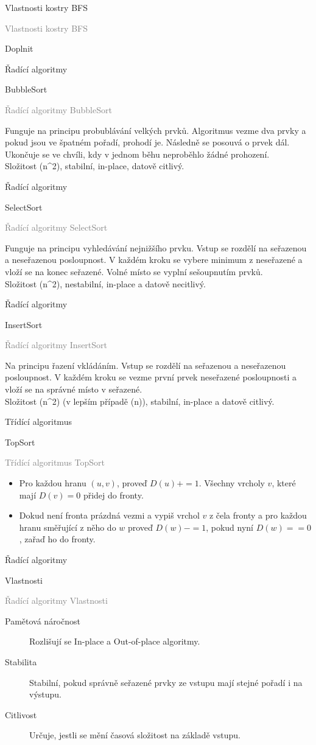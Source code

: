 \documentclass[20pt]{extarticle}
\newcommand{\card}[3][]{
	\vspace*{\fill}

	\newpage
	\topskip0pt
	\vspace*{\fill}
		\Large #2

		\vspace{1cm}
		\normalsize #1
	\vspace*{\fill}
	\newpage

	\small \textcolor{gray}{#2 #1}
	\topskip0pt
	\vspace*{\fill}

	\normalsize
	#3
	\vspace*{\fill}
}
\newcommand{\pair}[2]{\left(#1, #2\right)}
\begin{document}
\begin{center}
\card{Vlastnosti kostry BFS}{
	Doplnit
}

\card[BubbleSort]{Řadící algoritmy}{
	Funguje na principu probublávání velkých prvků. Algoritmus vezme dva prvky a pokud
	jsou ve špatném pořadí, prohodí je. Následně se posouvá o prvek dál.\\
	Ukončuje se ve chvíli, kdy v jednom běhu neproběhlo žádné prohození.\\
	Složitost \Omicron(n^2), stabilní, in-place, datově citlivý.
}

\card[SelectSort]{Řadící algoritmy}{
	Funguje na principu vyhledávání nejnižšího prvku. Vstup se rozdělí na seřazenou
	a neseřazenou posloupnost. V každém kroku se vybere minimum z neseřazené a vloží
	se na konec seřazené. Volné místo se vyplní sešoupnutím prvků.\\
	Složitost \Omicron(n^2), nestabilní, in-place a datově necitlivý.
}

\card[InsertSort]{Řadící algoritmy}{
	Na principu řazení vkládáním. Vstup se rozdělí na seřazenou a neseřazenou posloupnost.
	V každém kroku se vezme první prvek neseřazené posloupnosti a vloží se na správné
	místo v seřazené.\\
	Složitost \Omicron(n^2) (v lepším případě \Omicron(n)), stabilní, in-place a datově citlivý.
}

\card[TopSort]{Třídící algoritmus}{
	\small
	\begin{itemize}
		\item Pro každou hranu $\pair{u}{v}$, proveď $D(u)+=1$. Všechny vrcholy $v$, které mají
		$D(v)=0$ přidej do fronty.
		\item Dokud není fronta prázdná vezmi a vypiš vrchol $v$ z čela fronty a pro každou
		hranu směřující z něho do $w$ proveď $D(w)-=1$, pokud nyní $D(w)==0$, zařaď ho do fronty.
	\end{itemize}
	\normalsize
}

\card[Vlastnosti]{Řadící algoritmy}{
	\begin{description}
		\item[Pamětová náročnost] Rozlišují se In-place a Out-of-place algoritmy.
		\item[Stabilita] Stabilní, pokud správně seřazené prvky ze vstupu mají stejné pořadí i na výstupu.
		\item[Citlivost] Určuje, jestli se mění časová složitost na základě vstupu.
	\end{description}
}

\end{center}
\end{document}
